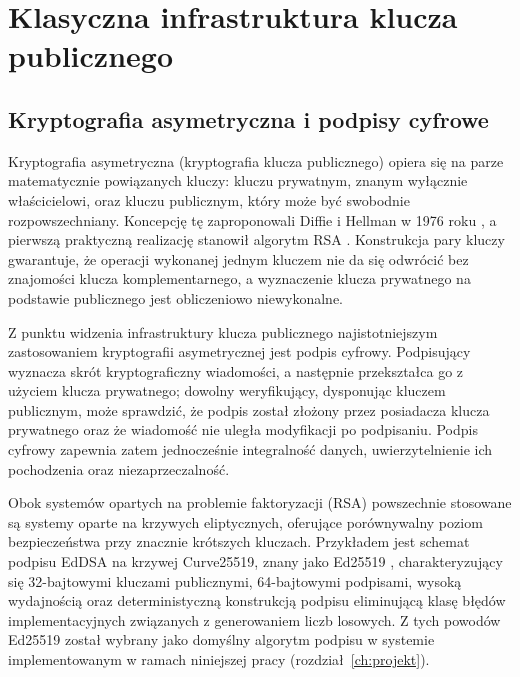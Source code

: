 \chapter{Klasyczna infrastruktura klucza publicznego}
\label{ch:pki-klasyczna}

\section{Kryptografia asymetryczna i podpisy cyfrowe}
\label{sec:kryptografia-asymetryczna}

Kryptografia asymetryczna (kryptografia klucza publicznego) opiera się na parze matematycznie powiązanych kluczy: kluczu prywatnym, znanym wyłącznie właścicielowi, oraz kluczu publicznym, który może być swobodnie rozpowszechniany. Koncepcję tę zaproponowali Diffie i Hellman w 1976 roku \cite{diffie1976new}, a pierwszą praktyczną realizację stanowił algorytm RSA \cite{rivest1978rsa}. Konstrukcja pary kluczy gwarantuje, że operacji wykonanej jednym kluczem nie da się odwrócić bez znajomości klucza komplementarnego, a wyznaczenie klucza prywatnego na podstawie publicznego jest obliczeniowo niewykonalne.

Z punktu widzenia infrastruktury klucza publicznego najistotniejszym zastosowaniem kryptografii asymetrycznej jest podpis cyfrowy. Podpisujący wyznacza skrót kryptograficzny wiadomości, a następnie przekształca go z użyciem klucza prywatnego; dowolny weryfikujący, dysponując kluczem publicznym, może sprawdzić, że podpis został złożony przez posiadacza klucza prywatnego oraz że wiadomość nie uległa modyfikacji po podpisaniu. Podpis cyfrowy zapewnia zatem jednocześnie integralność danych, uwierzytelnienie ich pochodzenia oraz niezaprzeczalność.

Obok systemów opartych na problemie faktoryzacji (RSA) powszechnie stosowane są systemy oparte na krzywych eliptycznych, oferujące porównywalny poziom bezpieczeństwa przy znacznie krótszych kluczach. Przykładem jest schemat podpisu EdDSA na krzywej Curve25519, znany jako Ed25519 \cite{rfc8032}, charakteryzujący się 32-bajtowymi kluczami publicznymi, 64-bajtowymi podpisami, wysoką wydajnością oraz deterministyczną konstrukcją podpisu eliminującą klasę błędów implementacyjnych związanych z generowaniem liczb losowych. Z tych powodów Ed25519 został wybrany jako domyślny algorytm podpisu w systemie implementowanym w ramach niniejszej pracy (rozdział~\ref{ch:projekt}).

